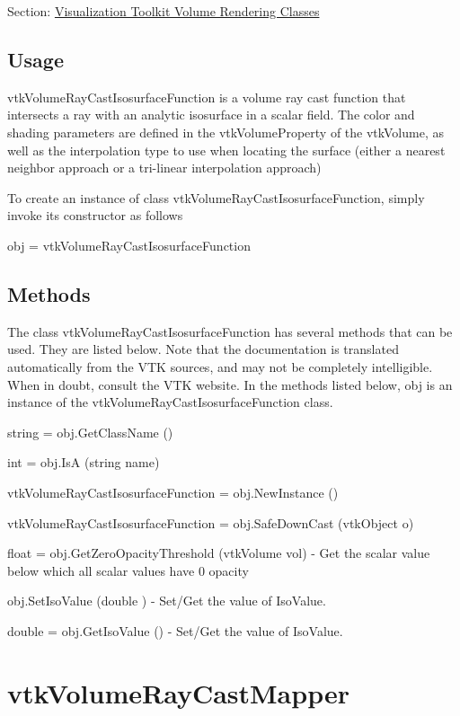 Section\-: \hyperlink{sec_vtkvolumerendering}{Visualization Toolkit Volume Rendering Classes} \hypertarget{vtkwidgets_vtkxyplotwidget_Usage}{}\subsection{Usage}\label{vtkwidgets_vtkxyplotwidget_Usage}
vtk\-Volume\-Ray\-Cast\-Isosurface\-Function is a volume ray cast function that intersects a ray with an analytic isosurface in a scalar field. The color and shading parameters are defined in the vtk\-Volume\-Property of the vtk\-Volume, as well as the interpolation type to use when locating the surface (either a nearest neighbor approach or a tri-\/linear interpolation approach)

To create an instance of class vtk\-Volume\-Ray\-Cast\-Isosurface\-Function, simply invoke its constructor as follows \begin{DoxyVerb}  obj = vtkVolumeRayCastIsosurfaceFunction
\end{DoxyVerb}
 \hypertarget{vtkwidgets_vtkxyplotwidget_Methods}{}\subsection{Methods}\label{vtkwidgets_vtkxyplotwidget_Methods}
The class vtk\-Volume\-Ray\-Cast\-Isosurface\-Function has several methods that can be used. They are listed below. Note that the documentation is translated automatically from the V\-T\-K sources, and may not be completely intelligible. When in doubt, consult the V\-T\-K website. In the methods listed below, {\ttfamily obj} is an instance of the vtk\-Volume\-Ray\-Cast\-Isosurface\-Function class. 
\begin{DoxyItemize}
\item {\ttfamily string = obj.\-Get\-Class\-Name ()}  
\item {\ttfamily int = obj.\-Is\-A (string name)}  
\item {\ttfamily vtk\-Volume\-Ray\-Cast\-Isosurface\-Function = obj.\-New\-Instance ()}  
\item {\ttfamily vtk\-Volume\-Ray\-Cast\-Isosurface\-Function = obj.\-Safe\-Down\-Cast (vtk\-Object o)}  
\item {\ttfamily float = obj.\-Get\-Zero\-Opacity\-Threshold (vtk\-Volume vol)} -\/ Get the scalar value below which all scalar values have 0 opacity  
\item {\ttfamily obj.\-Set\-Iso\-Value (double )} -\/ Set/\-Get the value of Iso\-Value.  
\item {\ttfamily double = obj.\-Get\-Iso\-Value ()} -\/ Set/\-Get the value of Iso\-Value.  
\end{DoxyItemize}\hypertarget{vtkvolumerendering_vtkvolumeraycastmapper}{}\section{vtk\-Volume\-Ray\-Cast\-Mapper}\label{vtkvolumerendering_vtkvolumeraycastmapper}
